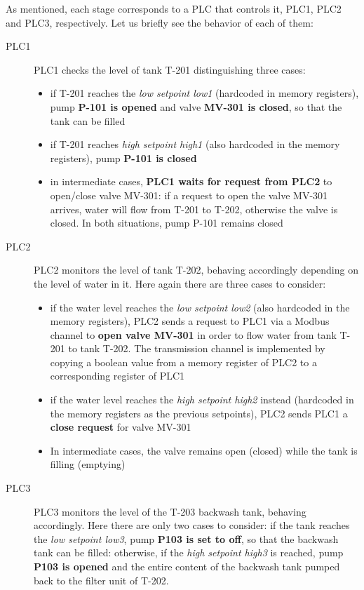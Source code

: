 \bigskip
As mentioned, each stage corresponds to a PLC that controls it, PLC1, PLC2 and PLC3, respectively. Let us briefly see the behavior of each of them:

\begin{description}
	\item[PLC1] PLC1 checks the level of tank T-201 distinguishing three cases:
	
	\begin{itemize}
		\item if T-201 reaches the \textit{low setpoint low1} (hardcoded in memory registers), pump \textbf{P-101 is opened} and valve \textbf{MV-301 is closed}, so that the tank can be filled
		
		\item if T-201 reaches \textit{high setpoint high1} (also hardcoded in the memory registers), pump \textbf{P-101 is closed}
		
		\item in intermediate cases, \textbf{PLC1 waits for request from PLC2} to open/close valve MV-301: if a request to open the valve MV-301 arrives, water will flow from T-201 to T-202, otherwise the valve is closed. In both situations, pump P-101 remains closed 
	\end{itemize}

	\item[PLC2] PLC2 monitors the level of tank T-202, behaving accordingly depending on the level of water in it. Here again there are three cases to consider:
	
	\begin{itemize}
		\item if the water level reaches the \textit{low setpoint low2} (also hardcoded in the memory registers), PLC2 sends a request to PLC1 via a Modbus channel to \textbf{open valve MV-301} in order to flow water from tank T-201 to tank T-202. The transmission channel is implemented by copying a boolean value from a memory register of PLC2 to a corresponding register of PLC1
		
		\item if the water level reaches the \textit{high setpoint high2} instead (hardcoded in the memory registers as the previous setpoints), PLC2 sends PLC1 a \textbf{close request} for valve MV-301
		
		\item In intermediate cases, the valve remains open (closed) while the tank is filling (emptying)
	\end{itemize}
	
	\item[PLC3] PLC3 monitors the level of the T-203 backwash tank, behaving accordingly. Here there are only two cases to consider: if the tank reaches the \textit{low setpoint low3}, pump \textbf{P103 is set to off}, so that the backwash tank can be filled: otherwise, if the \textit{high setpoint high3} is reached, pump \textbf{P103 is opened} and the entire content of the backwash tank pumped back to the filter unit of T-202.
	 
\end{description} 

